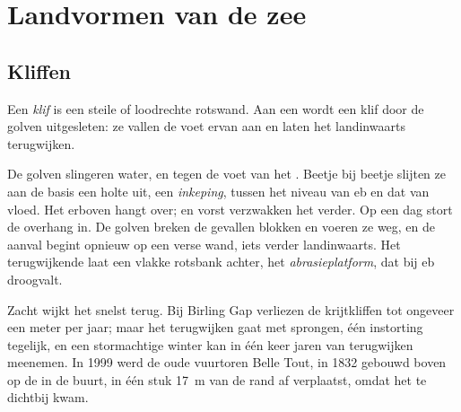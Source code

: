 \section{Landvormen van de zee}

\subsection{Kliffen}

\begin{definition}[Klif]\label{def:g9:landforms:cliff}
Een \emph{klif} is een steile of loodrechte rotswand. Aan een
 wordt een klif door de golven uitgesleten: ze vallen de voet ervan aan
en laten het landinwaarts terugwijken.
\end{definition}

De golven slingeren water,  en  tegen de voet van het .
Beetje bij beetje slijten ze aan de basis een holte uit, een
\emph{inkeping}, tussen het niveau van eb en dat van vloed. Het 
erboven hangt over;  en vorst verzwakken het verder. Op een dag stort
de overhang in. De golven breken de gevallen blokken en voeren ze weg, en
de aanval begint opnieuw op een verse wand, iets verder landinwaarts. Het
terugwijkende  laat een vlakke rotsbank achter, het
\emph{abrasieplatform}, dat bij eb droogvalt.

Zacht  wijkt het snelst terug. Bij Birling Gap verliezen de
krijtkliffen tot ongeveer een meter per jaar; maar het terugwijken gaat met
sprongen, één instorting tegelijk, en een stormachtige winter kan in één
keer jaren van terugwijken meenemen. In 1999 werd de oude vuurtoren Belle
Tout, in 1832 gebouwd boven op de  in de buurt, in één stuk
\qty{17}{m} van de rand af verplaatst, omdat het  te dichtbij kwam.

